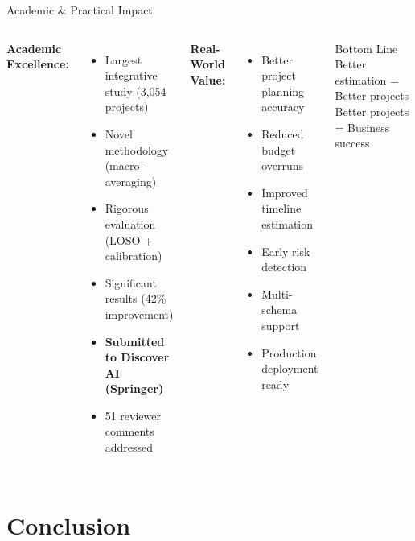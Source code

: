 \documentclass[aspectratio=169]{beamer}
\begin{document}
\begin{frame}{Academic \& Practical Impact}
\begin{columns}[T]
\textbf{Academic Excellence:}
\begin{itemize}
    \item Largest integrative study (3,054 projects)
    \item Novel methodology (macro-averaging)
    \item Rigorous evaluation (LOSO + calibration)
    \item Significant results (42\% improvement)
    \item \textbf{Submitted to Discover AI (Springer)}
    \item 51 reviewer comments addressed
\end{itemize}

\textbf{Real-World Value:}
\begin{itemize}
    \item Better project planning accuracy
    \item Reduced budget overruns
    \item Improved timeline estimation
    \item Early risk detection
    \item Multi-schema support
    \item Production deployment ready
\end{itemize}

\vspace{0.5cm}
\begin{exampleblock}{Bottom Line}
Better estimation = Better projects\\
Better projects = Business success
\end{exampleblock}
\end{columns}
\end{frame}

\section{Conclusion}
\end{document}
